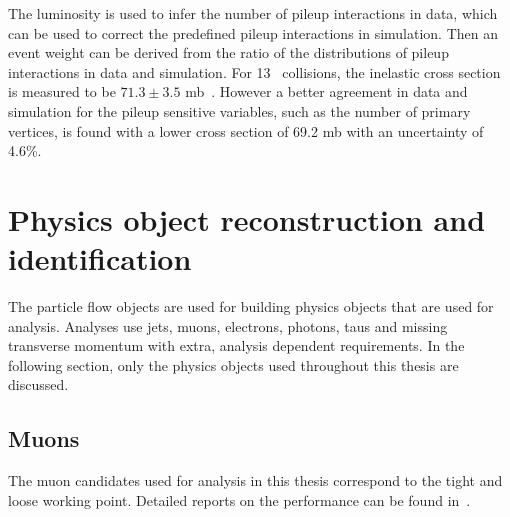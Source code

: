 The luminosity is used to infer the number of pileup interactions in data, which can be used to correct the predefined pileup interactions in simulation. Then an event weight can be derived from the ratio of the distributions of pileup interactions in data and simulation. For 13 \TeV\ collisions, the inelastic cross section is measured to be $71.3\pm3.5$ mb~\cite{CMS-PAS-FSQ-15-005}. However a better agreement in data and simulation for the pileup sensitive variables, such as the number of primary vertices, is found with a lower cross section of 69.2 mb with an uncertainty of 4.6\%. %



\section{Physics object reconstruction and identification}
\label{sec:PhysicsObject}
The particle flow objects are used for building physics objects that are used for analysis. Analyses use jets, muons, electrons, photons, taus and missing transverse momentum \ptmisvec with extra, analysis dependent requirements. In the following section, only the physics objects used throughout this thesis are discussed. 

\subsection{Muons}
\label{sec:MuonID}
The muon candidates used for analysis in this thesis correspond to the tight and loose working point. Detailed reports on the performance can be found in~\cite{CMS-DP-2017-007}.


